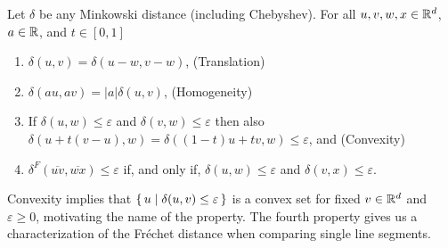 \begin{lemma}\label{lem:distance_properties}
	Let \(\delta\) be any Minkowski distance (including Chebyshev). For all \(u, v, w, x \in \mathbb{R}^d\), \(a \in \mathbb{R}\), and \(t \in [0, 1]\)
  \begin{enumerate}
		\item \(\delta(u, v) = \delta(u - w, v - w)\), \hfill (Translation)
		\item \(\delta(a u, a v) = |a| \delta(u, v)\), \hfill (Homogeneity)
		\item If \(\delta(u, w) \leq \varepsilon\) and \(\delta(v, w) \leq \varepsilon\) then also \(\delta(u + t(v-u), w) = \delta((1-t)u + tv, w) \leq \varepsilon\), and \hfill (Convexity)
		\item \(\delta^F(\overline{uv}, \overline{wx}) \leq \varepsilon\) if, and only if, \(\delta(u, w) \leq \varepsilon\) and \(\delta(v, x) \leq \varepsilon\).
	\end{enumerate}

\end{lemma}

Convexity implies that \(\set{u \mid \delta(u, v) \leq \varepsilon }\) is a convex set for fixed \(v \in \mathbb{R}^d\) and \(\varepsilon \geq 0\), motivating the name of the property. The fourth property gives us a characterization of the Fréchet distance when comparing single line segments. 

